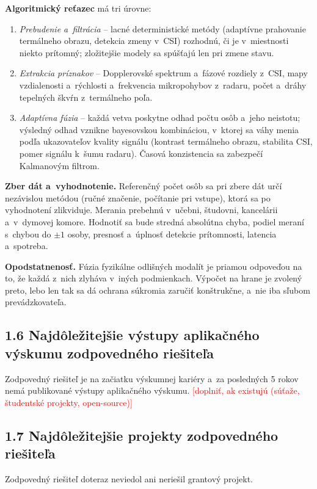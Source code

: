 \documentclass[11pt,a4paper]{article}
\newcommand{\doplnit}[1]{\textcolor{red}{[#1]}}
\begin{document}
\textbf{Algoritmický reťazec} má tri úrovne:
\begin{enumerate}[label=\textbf{Ú\arabic*:},leftmargin=*]
\item \emph{Prebudenie a~filtrácia} -- lacné deterministické metódy (adaptívne prahovanie termálneho obrazu, detekcia zmeny v~CSI) rozhodnú, či je v~miestnosti niekto prítomný; zložitejšie modely sa spúšťajú len pri zmene stavu.
\item \emph{Extrakcia príznakov} -- Dopplerovské spektrum a~fázové rozdiely z~CSI, mapy vzdialenosti a~rýchlosti a~frekvencia mikropohybov z~radaru, počet a~dráhy tepelných škvŕn z~termálneho poľa.
\item \emph{Adaptívna fúzia} -- každá vetva poskytne odhad počtu osôb a~jeho neistotu; výsledný odhad vznikne bayesovskou kombináciou, v~ktorej sa váhy menia podľa ukazovateľov kvality signálu (kontrast termálneho obrazu, stabilita CSI, pomer signálu k~šumu radaru). Časová konzistencia sa zabezpečí Kalmanovým filtrom.
\end{enumerate}

\textbf{Zber dát a~vyhodnotenie.} Referenčný počet osôb sa pri zbere dát určí nezávislou metódou (ručné značenie, počítanie pri vstupe), ktorá sa po vyhodnotení zlikviduje. Merania prebehnú v~učebni, študovni, kancelárii a~v~dymovej komore. Hodnotiť sa bude stredná absolútna chyba, podiel meraní s~chybou do $\pm 1$ osoby, presnosť a~úplnosť detekcie prítomnosti, latencia a~spotreba.

\textbf{Opodstatnenosť.} Fúzia fyzikálne odlišných modalít je priamou odpoveďou na to, že každá z~nich zlyháva v~iných podmienkach. Výpočet na hrane je zvolený preto, lebo len tak sa dá ochrana súkromia zaručiť konštrukčne, a~nie iba sľubom prevádzkovateľa.

\subsection*{1.6 Najdôležitejšie výstupy aplikačného výskumu zodpovedného riešiteľa}
Zodpovedný riešiteľ je na začiatku výskumnej kariéry a~za posledných 5 rokov nemá publikované výstupy aplikačného výskumu. \doplnit{doplniť, ak existujú (súťaže, študentské projekty, open-source)}

\subsection*{1.7 Najdôležitejšie projekty zodpovedného riešiteľa}
Zodpovedný riešiteľ doteraz neviedol ani neriešil grantový projekt.
\end{document}
